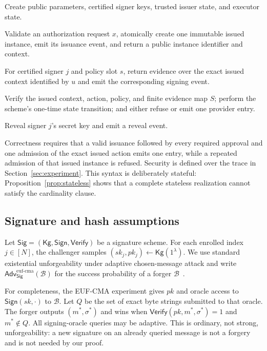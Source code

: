 \documentclass[10pt]{article}
\newcommand{\Adv}{\mathsf{Adv}}
\newcommand{\Sign}{\mathsf{Sign}}
\newcommand{\Verify}{\mathsf{Verify}}
\newcommand{\Issue}{\mathsf{Issue}}
\newcommand{\Admit}{\mathsf{Admit}}
\begin{document}
\begin{description}[leftmargin=2.3cm,style=nextline]
\item[$\mathsf{Setup}(1^\lambda)$.]
Create public parameters, certified signer keys, trusted issuer state, and
executor state.
\item[$\Issue(x)$.]
Validate an authorization request $x$, atomically create one immutable issued
instance, emit its issuance event, and return a public instance identifier and
context.
\item[$\mathsf{Approve}(j,u,s)$.]
For certified signer $j$ and policy slot $s$, return evidence over the exact
issued context identified by $u$ and emit the corresponding signing event.
\item[$\Admit(d,u,a,S)$.]
Verify the issued context, action, policy, and finite evidence map $S$; perform
the scheme's one-time state transition; and either refuse or emit one provider
entry.
\item[$\mathsf{Reveal}(j)$.]
Reveal signer $j$'s secret key and emit a reveal event.
\end{description}

Correctness requires that a valid issuance followed by every required approval
and one admission of the exact issued action emits one entry, while a repeated
admission of that issued instance is refused. Security is defined over the
trace in Section~\ref{sec:experiment}. This syntax is deliberately stateful:
Proposition~\ref{prop:stateless} shows that a complete stateless realization
cannot satisfy the cardinality clause.

\subsection{Signature and hash assumptions}

Let $\mathsf{Sig}=(\mathsf{Kg},\Sign,\Verify)$ be a signature scheme. For each
enrolled index $j\in[N]$, the challenger samples
$(sk_j,pk_j)\leftarrow\mathsf{Kg}(1^\lambda)$. We use standard existential
unforgeability under adaptive chosen-message attack and write
$\Adv^{\mathrm{euf\mbox{-}cma}}_{\mathsf{Sig}}(\mathcal B)$ for the success
probability of a forger $\mathcal B$~\cite{gmr88}.

For completeness, the EUF-CMA experiment gives $pk$ and oracle access to
$\Sign(sk,\cdot)$ to $\mathcal B$. Let $Q$ be the set of exact byte strings
submitted to that oracle. The forger outputs $(m^*,\sigma^*)$ and wins when
$\Verify(pk,m^*,\sigma^*)=1$ and $m^*\notin Q$. All signing-oracle queries may
be adaptive. This is ordinary, not strong, unforgeability: a new signature on
an already queried message is not a forgery and is not needed by our proof.
\end{document}
